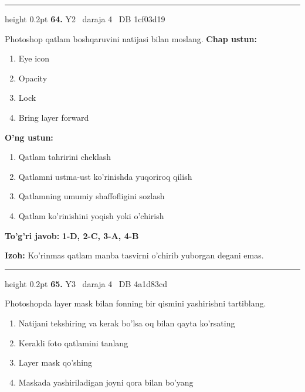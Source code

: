 \documentclass[10pt,a4paper,oneside]{article}
\begin{document}
\vspace{2mm}\hrule height 0.2pt \vspace{4mm}
\hypertarget{q64}{\textbf{\color{ink}64.}}  {\color{muted}\scriptsize Y2 \textbullet\ daraja 4 \textbullet\ DB 1cf03d19}
\par
Photoshop qatlam boshqaruvini natijasi bilan moslang.
\textbf{\footnotesize Chap ustun:}
\begin{enumerate}[label=\arabic*),leftmargin=9mm]
\item Eye icon
\item Opacity
\item Lock
\item Bring layer forward
\end{enumerate}
\textbf{\footnotesize O'ng ustun:}
\begin{enumerate}[label=\Alph*),leftmargin=9mm]
\item Qatlam tahririni cheklash
\item Qatlamni ustma-ust ko'rinishda yuqoriroq qilish
\item Qatlamning umumiy shaffofligini sozlash
\item Qatlam ko'rinishini yoqish yoki o'chirish
\end{enumerate}
\begin{tcolorbox}[enhanced,breakable,colback=teal!4,colframe=teal!45!black,boxrule=0.45pt,arc=1.2mm,left=2.8mm,right=2.8mm,top=2mm,bottom=2mm,before skip=2mm,after skip=2mm]
\textbf{\color{teal}To'g'ri javob:} \textbf{1-D, 2-C, 3-A, 4-B}
\par\smallskip
\textbf{Izoh:} Ko'rinmas qatlam manba tasvirni o'chirib yuborgan degani emas.
\end{tcolorbox}
\vspace{2mm}\hrule height 0.2pt \vspace{4mm}
\hypertarget{q65}{\textbf{\color{ink}65.}}  {\color{muted}\scriptsize Y3 \textbullet\ daraja 4 \textbullet\ DB 4a1d83cd}
\par
Photoshopda layer mask bilan fonning bir qismini yashirishni tartiblang.
\begin{enumerate}[label=\Alph*),leftmargin=9mm]
\item Natijani tekshiring va kerak bo'lsa oq bilan qayta ko'rsating
\item Kerakli foto qatlamini tanlang
\item Layer mask qo'shing
\item Maskada yashiriladigan joyni qora bilan bo'yang
\end{enumerate}
\end{document}
